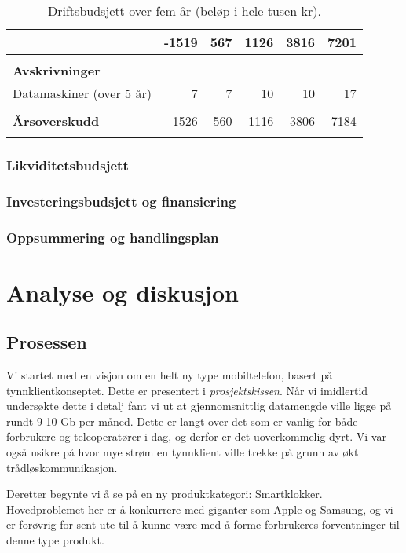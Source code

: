 \begin{table}
\begin{tabular}{lrrrrr}
                                    & -1519 &  567 & 1126 &  3816 &  7201 \\
    \hline
    \\
    \textbf{Avskrivninger} \\
    Datamaskiner (over 5 år)        &     7 &    7 &   10 &    10 &    17 \\
    \\
    \textbf{Årsoverskudd}           & -1526 &  560 & 1116 &  3806 &  7184 \\
    \thickhline
    \\
  \end{tabular}
  \caption{Driftsbudsjett over fem år (beløp i hele tusen kr).}
  \label{table.driftsbudsjett}
\end{table}

\subsection{Likviditetsbudsjett}

\subsection{Investeringsbudsjett og finansiering}

\subsection{Oppsummering og handlingsplan}

\chapter{Analyse og diskusjon}

\section{Prosessen}
\label{prosessen}

Vi startet med en visjon om en helt ny type mobiltelefon, basert på
tynnklientkonseptet. Dette er presentert i \textit{prosjektskissen}. Når vi
imidlertid undersøkte dette i detalj fant vi ut at gjennomsnittlig datamengde
ville ligge på rundt 9-10 Gb per måned. Dette er langt over det som er vanlig
for både forbrukere og teleoperatører i dag, og derfor er det uoverkommelig
dyrt. Vi var også usikre på hvor mye strøm en tynnklient ville trekke på grunn
av økt trådløskommunikasjon.

Deretter begynte vi å se på en ny produktkategori: Smartklokker. Hovedproblemet
her er å konkurrere med giganter som Apple og Samsung, og vi er forøvrig for
sent ute til å kunne være med å forme forbrukeres forventninger til denne type
produkt.

